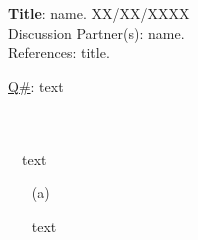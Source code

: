 \documentclass{article}
\begin{document}
\begin{center} %
    \textbf{Title}: name. XX/XX/XXXX\\
    Discussion Partner(s): name.\\
    References: title.
\end{center}
\noindent
\underline{Q\#}: text\\ %
\\\\
\ \ text\\
\begin{itemize} %
    \item[(a)] 
    text
\end{itemize}
\end{document}
